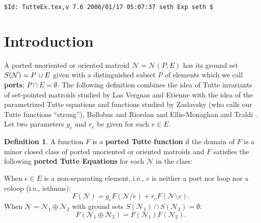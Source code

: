 \documentclass[12pt]{article}
\theoremstyle{definition}
\newtheorem{definition}[theorem]{Definition}
\newcommand{\dunion}
{\mbox{\hbox{\hskip6pt$\cdot$\hskip-5.50pt$\cup$\hskip2pt}}}
\begin{document}
\newpage
\noindent\verb|$Id: TutteEx.tex,v 7.6 2006/01/17 05:07:37 seth Exp seth $|

\tableofcontents

\section{Introduction}

A ported unoriented or oriented matroid 
$\mathcal{N}=\mathcal{N}(P,E)$ 
has its ground set 
$S(\mathcal{N})=P\dunion E$ given with a distinguished
subset $P$ of elements which we call \textbf{ports}; $P\cap E=\emptyset$.
The following definition 
combines the idea of Tutte invariants of set-pointed matroids
studied by Las Vergnas and Etienne 
\cite{MR0419272,SetPointedLV,EtienneLasVergnasMorphismVectorial}
with the idea of the parametrized Tutte equations and functions 
studied by 
Zaslavsky\cite{MR93a:05047} (who calls our Tutte functions ``strong''), 
Bollobas and 
Riordan\cite{BollobasRiordanTuttePolyColored} and
Ellis-Monaghan and Traldi \cite{Ellis-Monaghan-Traldi}.
Let two parameters $g_e$ and $r_e$ be given for each $e\in E$.

\begin{definition}
\label{firstTutteFunction}
A function $F$ is a 
\textbf{ported Tutte function}
if the domain of  $F$ is 
a minor closed class
of ported unoriented or oriented matroids and
$F$ satisfies the following
\textbf{ported Tutte Equations}
for each $\mathcal{N}$ in the class:


When $e\in E$ is a non-separating element, i.e.,
$e$ is neither a port nor loop nor a coloop (i.e., isthmus):
\begin{equation}\label{TGplus}
	F(\mathcal{N}) = g_eF(\mathcal{N}/ e) + r_eF(\mathcal{N}\setminus e).
\end{equation}
When $\mathcal{N}=\mathcal{N}_1\oplus\mathcal{N}_2$
with ground sets $S(\mathcal{N}_1)\cap S(\mathcal{N}_2)=\emptyset$:
\begin{equation}\label{TGtimes}
	F(\mathcal{N}_1\oplus\mathcal{N}_2) = F(\mathcal{N}_1)F(\mathcal{N}_2).
\end{equation}


\end{definition}
\end{document}
